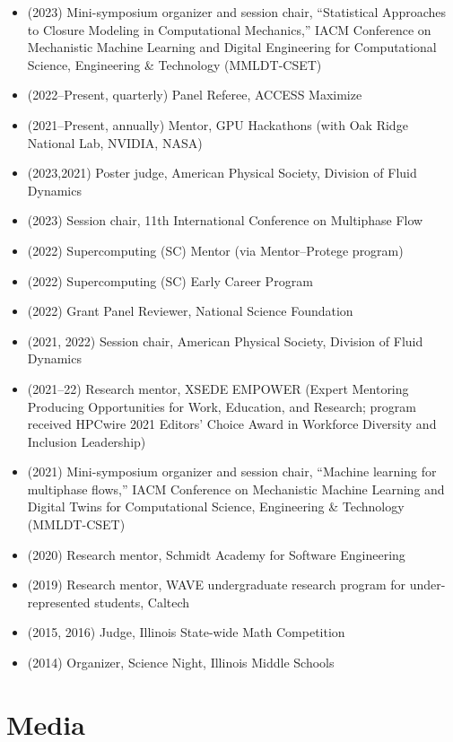 \begin{itemize}
    \item (2023) Mini-symposium organizer and session chair, ``Statistical Approaches to Closure Modeling in Computational Mechanics,'' IACM Conference on Mechanistic Machine Learning and Digital Engineering for Computational Science, Engineering \& Technology (MMLDT-CSET)
    \item (2022--Present, quarterly) Panel Referee, ACCESS Maximize
    \item (2021--Present, annually) Mentor, GPU Hackathons (with Oak Ridge National Lab, NVIDIA, NASA)
    \item (2023,2021) Poster judge, American Physical Society, Division of Fluid Dynamics
    \item (2023) Session chair, 11th International Conference on Multiphase Flow
    \item (2022) Supercomputing (SC) Mentor (via Mentor--Protege program)
    \item (2022) Supercomputing (SC) Early Career Program
    \item (2022) Grant Panel Reviewer, National Science Foundation
    \item (2021, 2022) Session chair, American Physical Society, Division of Fluid Dynamics
    \item (2021--22) Research mentor, XSEDE EMPOWER (Expert Mentoring Producing Opportunities for Work, Education, and Research; program received HPCwire 2021 Editors' Choice Award in Workforce Diversity and Inclusion Leadership)
    \item (2021) Mini-symposium organizer and session chair, ``Machine learning for multiphase flows,'' IACM Conference on Mechanistic Machine Learning and Digital Twins for Computational Science, Engineering \& Technology (MMLDT-CSET)
    \item (2020) Research mentor, Schmidt Academy for Software Engineering
    \item (2019) Research mentor, WAVE undergraduate research program for under-represented students, Caltech
    \item (2015, 2016) Judge, Illinois State-wide Math Competition
    \item (2014) Organizer, Science Night, Illinois Middle Schools
\end{itemize}

\section{Media}

